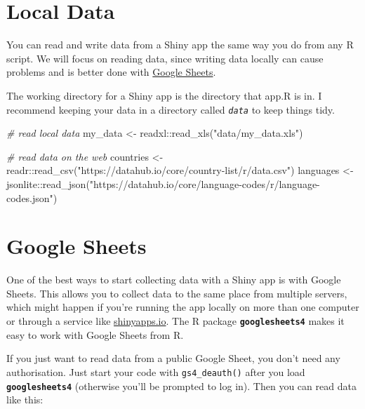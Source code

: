 \documentclass[
  oneside]{book}
\newenvironment{Shaded}{\begin{snugshade}}{\end{snugshade}}
\newcommand{\CommentTok}[1]{\textcolor[rgb]{0.56,0.35,0.01}{\textit{#1}}}
\newcommand{\FunctionTok}[1]{\textcolor[rgb]{0.00,0.00,0.00}{#1}}
\newcommand{\NormalTok}[1]{#1}
\newcommand{\OtherTok}[1]{\textcolor[rgb]{0.56,0.35,0.01}{#1}}
\newcommand{\SpecialCharTok}[1]{\textcolor[rgb]{0.00,0.00,0.00}{#1}}
\newcommand{\StringTok}[1]{\textcolor[rgb]{0.31,0.60,0.02}{#1}}
\begin{document}
\hypertarget{local-data}{%
\section{Local Data}\label{local-data}}

You can read and write data from a Shiny app the same way you do from any R script. We will focus on reading data, since writing data locally can cause problems and is better done with \protect\hyperlink{google_sheets}{Google Sheets}.

The working directory for a Shiny app is the directory that app.R is in. I recommend keeping your data in a directory called \textit{\texttt{data}} to keep things tidy.

\begin{Shaded}
\begin{Highlighting}[]
\CommentTok{\# read local data}
\NormalTok{my\_data }\OtherTok{\textless{}{-}}\NormalTok{ readxl}\SpecialCharTok{::}\FunctionTok{read\_xls}\NormalTok{(}\StringTok{"data/my\_data.xls"}\NormalTok{)}

\CommentTok{\# read data on the web}
\NormalTok{countries }\OtherTok{\textless{}{-}}\NormalTok{ readr}\SpecialCharTok{::}\FunctionTok{read\_csv}\NormalTok{(}\StringTok{"https://datahub.io/core/country{-}list/r/data.csv"}\NormalTok{)}
\NormalTok{languages }\OtherTok{\textless{}{-}}\NormalTok{ jsonlite}\SpecialCharTok{::}\FunctionTok{read\_json}\NormalTok{(}\StringTok{"https://datahub.io/core/language{-}codes/r/language{-}codes.json"}\NormalTok{)}
\end{Highlighting}
\end{Shaded}

\hypertarget{google_sheets}{%
\section{Google Sheets}\label{google_sheets}}

One of the best ways to start collecting data with a Shiny app is with Google Sheets. This allows you to collect data to the same place from multiple servers, which might happen if you're running the app locally on more than one computer or through a service like \href{https://shinyapps.io}{shinyapps.io}. The R package \textbf{\texttt{googlesheets4}} makes it easy to work with Google Sheets from R.

If you just want to read data from a public Google Sheet, you don't need any authorisation. Just start your code with \texttt{gs4\_deauth}\texttt{()} after you load \textbf{\texttt{googlesheets4}} (otherwise you'll be prompted to log in). Then you can read data like this:
\end{document}
